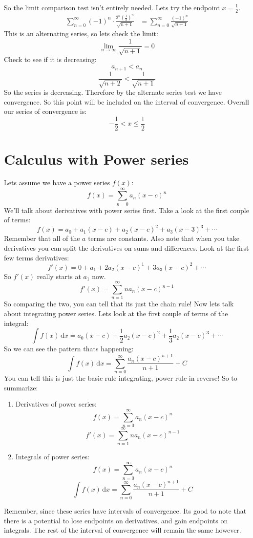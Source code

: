 \documentclass{report}
\begin{document}
        So the limit comparison test isn't entirely needed. 
        Lets try the endpoint \(x = \frac{1}{2}\).
        \begin{align*}
            \sum_{n=0}^{\infty} (-1)^n \cdot \frac{2^n(\frac{1}{2})^n}{\sqrt{n+1}}
            &= \sum_{n=0}^{\infty} \frac{(-1)^n}{\sqrt{n+1}}
        \end{align*}
        This is an alternating series, so lets check the limit:
        \[\lim_{n \to \infty} \frac{1}{\sqrt{n+1}} = 0\]
        Check to see if it is decreasing:
        \[a_{n+1} < a_n\]
        \[\frac{1}{\sqrt{n+2}} < \frac{1}{\sqrt{n+1}}\]
        So the series is decreasing. 
        Therefore by the alternate series test we have convergence.
        So this point will be included on the interval of convergence.
        Overall our series of convergence is:
        \[- \frac{1}{2} < x \leq \frac{1}{2}\]

\section{Calculus with Power series}
    Lets assume we have a power series \(f(x)\):
    \[f(x) = \sum_{n=0}^{\infty} a_n (x-c)^n\]
    We'll talk about derivatives with power series first.
    Take a look at the first couple of terms:
    \[f(x) = a_0 + a_1(x-c) + a_2(x-c)^2 + a_3(x-3)^3 + \cdots\]
    Remember that all of the \(a\) terms are constants.
    Also note that when you take derivatives you can split the derivatives on sums and differences.
    Look at the first few terms derivatives:
    \[f'(x) = 0 + a_1 + 2a_2(x-c)^1 + 3a_3(x-c)^2 + \cdots\]
    So \(f'(x)\) really starts at \(a_1\) now.
    \[f'(x) = \sum_{n = 1}^{\infty} na_n(x-c)^{n-1}\]
    So comparing the two, you can tell that its just the chain rule!
    Now lets talk about integrating power series.
    Lets look at the first couple of terms of the integral:
    \[\int f(x) \,\mathrm{d}x = a_0(x-c) + \frac{1}{2}a_2(x-c)^2 + \frac{1}{3}a_2(x-c)^3 + \cdots\]
    So we can see the pattern thats happening:
    \[\int f(x) \,\mathrm{d}x = \sum_{n=0}^{\infty} \frac{a_n(x-c)^{n+1}}{n+1} + C\]
    You can tell this is just the basic rule integrating, power rule in reverse!
    So to summarize:
    \begin{enumerate}
        \item Derivatives of power series:
        \[f(x) = \sum_{n=0}^{\infty} a_n (x-c)^n\]
        \[f'(x) = \sum_{n = 1}^{\infty} na_n(x-c)^{n-1}\]
        \item Integrals of power series:
        \[f(x) = \sum_{n=0}^{\infty} a_n (x-c)^n\]
        \[\int f(x) \,\mathrm{d}x = \sum_{n=0}^{\infty} \frac{a_n(x-c)^{n+1}}{n+1} + C\]
    \end{enumerate}
    Remember, since these series have intervals of convergence.
    Its good to note that there is a potential to lose endpoints on derivatives, and gain endpoints on integrals.
    The rest of the interval of convergence will remain the same however.
    
\end{document}
